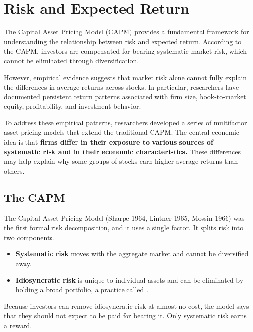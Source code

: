 \section{Risk and Expected Return}
\label{sec:04-decomposition}


The Capital Asset Pricing Model (CAPM) provides a fundamental framework for understanding the relationship between risk and expected return. According to the CAPM, investors are compensated for bearing systematic market risk, which cannot be eliminated through diversification. 

However, empirical evidence suggests that market risk alone cannot fully explain the differences in average returns across stocks. In particular, researchers have documented persistent return patterns associated with firm size, book-to-market equity, profitability, and investment behavior.

To address these empirical patterns, researchers developed a series of multifactor asset pricing models that extend the traditional CAPM. The central economic idea is that \textbf{firms differ in their exposure to various sources of systematic risk and in their economic characteristics.} These differences may help explain why some groups of stocks earn higher average returns than others.


\subsection{The CAPM}
\label{sec:04-capm}
The Capital Asset Pricing Model (Sharpe 1964, Lintner 1965, Mossin 1966) was the first formal risk decomposition, and it uses a single factor. It splits risk into two components.
\begin{itemize}
\item \textbf{Systematic risk} moves with the aggregate market and cannot be diversified away. 
\item \textbf{Idiosyncratic risk} is unique to individual assets and can be eliminated by holding a broad portfolio, a practice called . 
\end{itemize}
Because investors can remove idiosyncratic risk at almost no cost, the model says that they should not expect to be paid for bearing it. Only systematic risk earns a reward.

